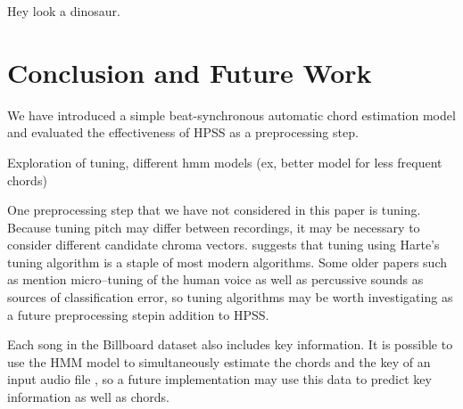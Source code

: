 \documentclass{article}
\begin{document}
Hey look a dinosaur.

\section{Conclusion and Future Work}

We have introduced a simple beat-synchronous automatic chord estimation model
and evaluated the effectiveness of HPSS as a preprocessing step.

Exploration of tuning, different hmm models (ex, better model for less frequent chords)

One preprocessing step that we have not considered in this paper is tuning.
Because tuning pitch may differ between recordings, it may be necessary to
consider different candidate chroma vectors.  \cite{McVicar:00} suggests that
tuning using Harte's tuning algorithm is a staple of most modern algorithms.
Some older papers such as \cite{Zenz:20} mention micro--tuning of the human
voice as well as percussive sounds as sources of classification error, so
tuning algorithms may be worth investigating as a future preprocessing stepin
addition to HPSS. 

Each song in the Billboard dataset also includes key information. It is
possible to use the HMM model to simultaneously estimate the chords and the key
of an input audio file \cite{McVicar:00}, so a future implementation may use
this data to predict key information as well as chords.
\end{document}
